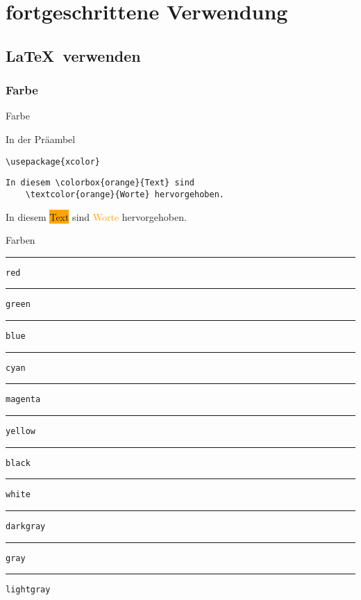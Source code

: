 \chapter{fortgeschrittene Verwendung}


\website

\section{\LaTeX\ verwenden}

\subsection{Farbe}

\begin{Frame}[fragile]{Farbe}
  \begin{Block}{In der Präambel}
    \begin{lstlisting}[gobble=6,style=block]
      \usepackage{xcolor}
    \end{lstlisting}
  \end{Block}

  \xxx

  \begin{lstlisting}[gobble=4]
    In diesem \colorbox{orange}{Text} sind
    \textcolor{orange}{Worte} hervorgehoben.
  \end{lstlisting}

  In diesem \colorbox{orange}{Text} sind
  \textcolor{orange}{Worte} hervorgehoben.
\end{Frame}

\newcommand{\colorsample}[1]{\textcolor{#1}{\rule[-.5ex]{2em}{2ex}} \texttt{#1}}

\begin{Frame}{Farben}
  \colorsample{red}\newline
  \colorsample{green}\newline
  \colorsample{blue}\newline
  \colorsample{cyan}\newline
  \colorsample{magenta}\newline
  \colorsample{yellow}

  \xxx

  \colorsample{black}\newline
  \colorsample{white}\newline
  \colorsample{darkgray}\newline
  \colorsample{gray}\newline
  \colorsample{lightgray}
\end{Frame}

